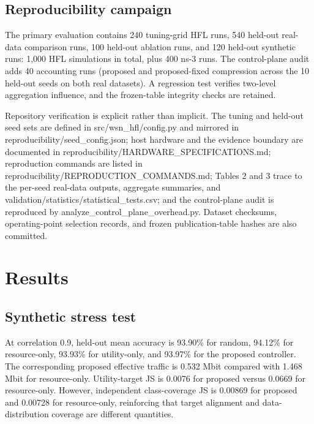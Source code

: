 \documentclass[11pt]{article}
\begin{document}
\subsection*{Reproducibility campaign}
The primary evaluation contains 240 tuning-grid HFL runs, 540 held-out real-data comparison runs, 100 held-out ablation runs, and 120 held-out synthetic runs: 1,000 HFL simulations in total, plus 400 ns-3 runs. The control-plane audit adds 40 accounting runs (proposed and proposed-fixed compression across the 10 held-out seeds on both real datasets). A regression test verifies two-level aggregation influence, and the frozen-table integrity checks are retained.\par
Repository verification is explicit rather than implicit. The tuning and held-out seed sets are defined in src/wsn\_hfl/config.py and mirrored in reproducibility/seed\_config.json; host hardware and the evidence boundary are documented in reproducibility/HARDWARE\_SPECIFICATIONS.md; reproduction commands are listed in reproducibility/REPRODUCTION\_COMMANDS.md; Tables 2 and 3 trace to the per-seed real-data outputs, aggregate summaries, and validation/statistics/statistical\_tests.csv; and the control-plane audit is reproduced by analyze\_control\_plane\_overhead.py. Dataset checksums, operating-point selection records, and frozen publication-table hashes are also committed.\par
\section{Results}
\subsection*{Synthetic stress test}
At correlation 0.9, held-out mean accuracy is 93.90\% for random, 94.12\% for resource-only, 93.93\% for utility-only, and 93.97\% for the proposed controller. The corresponding proposed effective traffic is 0.532 Mbit compared with 1.468 Mbit for resource-only. Utility-target JS is 0.0076 for proposed versus 0.0669 for resource-only. However, independent class-coverage JS is 0.00869 for proposed and 0.00728 for resource-only, reinforcing that target alignment and data-distribution coverage are different quantities.\par
\end{document}
